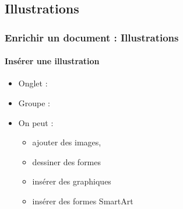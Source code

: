 \documentclass[xcolor=table]{beamer}
\begin{document}
\subsection{Illustrations}

\begin{frame}[t]
\frametitle{Enrichir un document : Illustrations}
\framesubtitle{Insérer une illustration}

\begin{minipage}{0.43\textwidth}
\begin{itemize}
	\item Onglet : 
	\item Groupe : 
	\item On peut :
	\begin{itemize}
		\item ajouter des images,
		\item dessiner des formes
		\item insérer des graphiques
		\item insérer des formes SmartArt
	\end{itemize}
\end{itemize}
\end{minipage}
\begin{minipage}{0.28\textwidth}
	
	
\end{minipage}
\begin{minipage}{0.27\textwidth}	
\end{minipage}

\end{frame}
\end{document}
